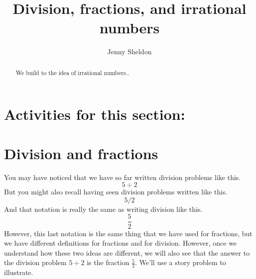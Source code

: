 \documentclass{ximera}
\title{Division, fractions, and irrational numbers}
\author{Jenny Sheldon}
\begin{document}
\begin{abstract}
We build to the idea of irrational numbers..
\end{abstract}
\maketitle

\section{Activities for this section:} 

\section{Division and fractions}

You may have noticed that we have so far written division problems like this.
\[
5 \div 2
\]
But you might also recall having seen division problems written like this.
\[
5 / 2
\]
And that notation is really the same as writing division like this.
\[
\frac{5}{2}
\]
However, this last notation is the same thing that we have used for fractions, but we have  different definitions for fractions and for division. However, once we understand how these two ideas are different, we will also see that the answer to the division problem $5 \div 2$ is  the fraction $\frac{5}{2}$. We'll use a story problem to illustrate.
\end{document}
